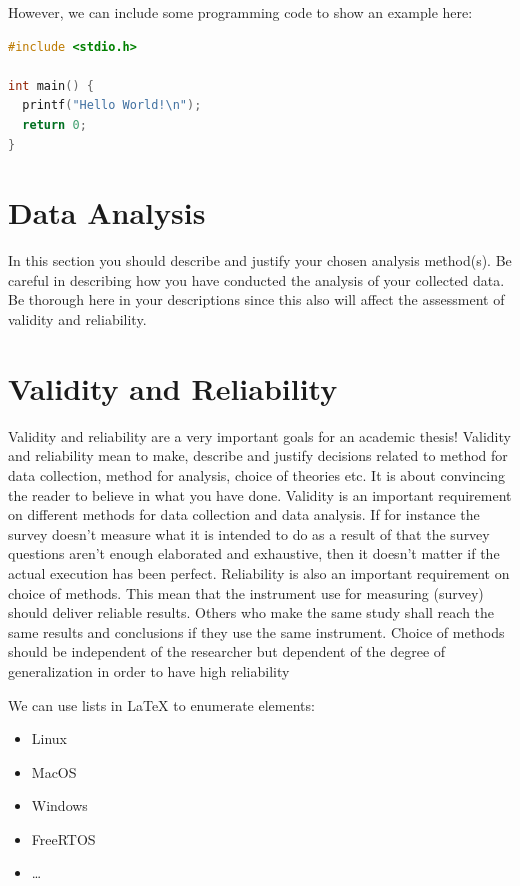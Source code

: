 \documentclass[a4paper, 12pt]{report}
\begin{document}
However, we can include some programming code to show an example here:

\begin{lstlisting}[language=C]
#include <stdio.h>

int main() {
  printf("Hello World!\n");
  return 0;
}
\end{lstlisting}

\section{Data Analysis}

\textcolor{jupurple}{
In this section you should describe and justify your chosen analysis method(s). Be careful in describing how you have conducted the analysis of your collected data. Be thorough here in your descriptions since this also will affect the assessment of validity and reliability.
}

\medskip\lipsum[1]

\section{Validity and Reliability}

\textcolor{jupurple}{
Validity and reliability are a very important goals for an academic thesis! Validity and reliability mean to make, describe and justify decisions related to method for data collection, method for analysis, choice of theories etc. It is about convincing the reader to believe in what you have done.
Validity is an important requirement on different methods for data collection and data analysis. If for instance the survey doesn’t measure what it is intended to do as a result of that the survey questions aren’t enough elaborated and exhaustive, then it doesn’t matter if the actual execution has been perfect.
Reliability is also an important requirement on choice of methods. This mean that the instrument use for measuring (survey) should deliver reliable results. Others who make the same study shall reach the same results and conclusions if they use the same instrument. Choice of methods should be independent of the researcher but dependent of the degree of generalization in order to have high reliability
}

\medskip
We can use lists in LaTeX to enumerate elements:

\begin{itemize}
  \item Linux
  \item MacOS
  \item Windows
  \item FreeRTOS
  \item\dots
\end{itemize}
\end{document}
